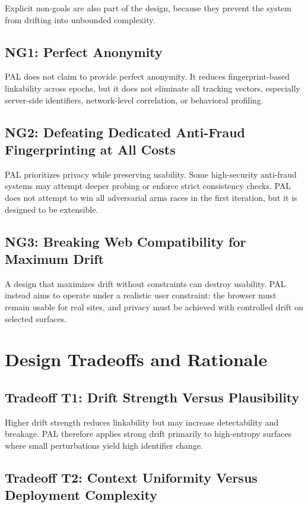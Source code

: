 \documentclass[11pt]{report}
\begin{document}
Explicit non-goals are also part of the design, because they prevent the system from drifting into unbounded complexity.

\subsection{NG1: Perfect Anonymity}

PAL does not claim to provide perfect anonymity. It reduces fingerprint-based linkability across epochs, but it does not eliminate all tracking vectors, especially server-side identifiers, network-level correlation, or behavioral profiling.

\subsection{NG2: Defeating Dedicated Anti-Fraud Fingerprinting at All Costs}

PAL prioritizes privacy while preserving usability. Some high-security anti-fraud systems may attempt deeper probing or enforce strict consistency checks. PAL does not attempt to win all adversarial arms races in the first iteration, but it is designed to be extensible.

\subsection{NG3: Breaking Web Compatibility for Maximum Drift}

A design that maximizes drift without constraints can destroy usability. PAL instead aims to operate under a realistic user constraint: the browser must remain usable for real sites, and privacy must be achieved with controlled drift on selected surfaces.

\section{Design Tradeoffs and Rationale}

\subsection{Tradeoff T1: Drift Strength Versus Plausibility}

Higher drift strength reduces linkability but may increase detectability and breakage. PAL therefore applies strong drift primarily to high-entropy surfaces where small perturbations yield high identifier change.

\subsection{Tradeoff T2: Context Uniformity Versus Deployment Complexity}
\end{document}
